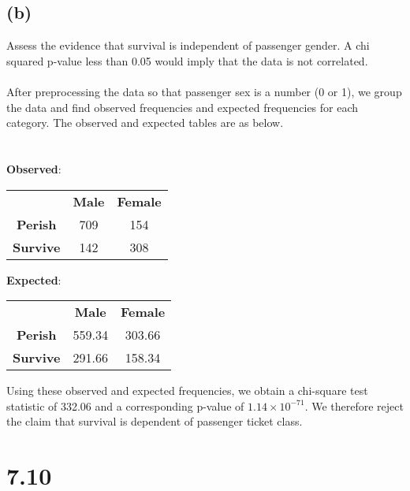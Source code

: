 \documentclass[11pt]{article}
\begin{document}
\subsection*{(b)}
Assess the evidence that survival is independent of passenger gender. A chi squared p-value less than 0.05 would imply that the data is not correlated. \\ \\
After preprocessing the data so that passenger sex is a number (0 or 1), we group the data and find observed frequencies and expected frequencies for each category. The observed and expected tables are as below. \\ \\
\clearpage
\ \\
\textbf{Observed}:
\begin{center}
\begin{tabular}{ c c c }
& \textbf{Male} & \textbf{Female} \\
\textbf{Perish} & 709 & 154 \\
\textbf{Survive} & 142 & 308
\end{tabular}
\end{center}
\textbf{Expected}:
\begin{center}
\begin{tabular}{ c c c }
& \textbf{Male} & \textbf{Female} \\
\textbf{Perish} & 559.34 & 303.66 \\
\textbf{Survive} & 291.66 & 158.34
\end{tabular}
\end{center}
Using these observed and expected frequencies, we obtain a chi-square test statistic of 332.06 and a corresponding p-value of $1.14\times10^{-71}$. We therefore reject the claim that survival is dependent of passenger ticket class.
\section*{7.10}
\end{document}
